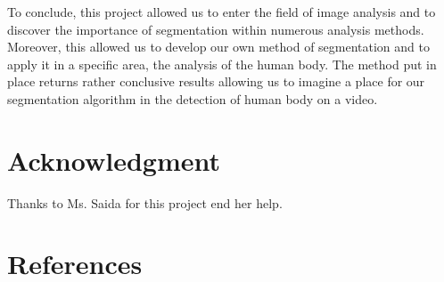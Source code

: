 \documentclass[conference]{IEEEtran}
\begin{document}
To conclude, this project allowed us to enter the field of image analysis and to discover the importance of segmentation within numerous analysis methods. Moreover, this allowed us to develop our own method of segmentation and to apply it in a specific area, the analysis of the human body. The method put in place returns rather conclusive results allowing us to imagine a place for our segmentation algorithm in the detection of human body on a video.


\section*{Acknowledgment}

Thanks to Ms. Saida for this project end her help.

\section*{References}



\vspace{12pt}
\color{red}
\end{document}
